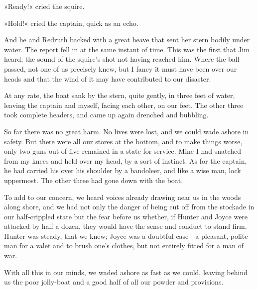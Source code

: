»Ready!« cried the squire.

»Hold!« cried the captain, quick as an echo.

And he and Redruth backed with a great heave that sent her stern bodily under water. The report fell in at the same instant of time. This was the first that Jim heard, the sound of the squire's shot not having reached him. Where the ball passed, not one of us precisely knew, but I fancy it must have been over our heads and that the wind of it may have contributed to our disaster.

At any rate, the boat sank by the stern, quite gently, in three feet of water, leaving the captain and myself, facing each other, on our feet. The other three took complete headers, and came up again drenched and bubbling.

So far there was no great harm. No lives were lost, and we could wade ashore in safety. But there were all our stores at the bottom, and to make things worse, only two guns out of five remained in a state for service. Mine I had snatched from my knees and held over my head, by a sort of instinct. As for the captain, he had carried his over his shoulder by a bandoleer, and like a wise man, lock uppermost. The other three had gone down with the boat.

To add to our concern, we heard voices already drawing near us in the woods along shore, and we had not only the danger of being cut off from the stockade in our half-crippled state but the fear before us whether, if Hunter and Joyce were attacked by half a dozen, they would have the sense and conduct to stand firm. Hunter was steady, that we knew; Joyce was a doubtful case—a pleasant, polite man for a valet and to brush one's clothes, but not entirely fitted for a man of war.

With all this in our minds, we waded ashore as fast as we could, leaving behind us the poor jolly-boat and a good half of all our powder and provisions.